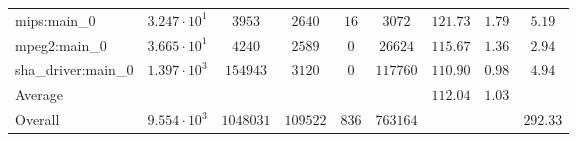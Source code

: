 \begin{tabular}{|l|c|c|c|c|c|c|c|c|}
mips:main\_0            & $ 3.247 \cdot 10^{1} $ & $ 3953    $ & $ 2640   $ & $ 16  $ & $ 3072   $ & $ 121.73      $ & $ 1.79    $ & $ 5.19    $ \\
mpeg2:main\_0           & $ 3.665 \cdot 10^{1} $ & $ 4240    $ & $ 2589   $ & $ 0   $ & $ 26624  $ & $ 115.67      $ & $ 1.36    $ & $ 2.94    $ \\
sha\_driver:main\_0     & $ 1.397 \cdot 10^{3} $ & $ 154943  $ & $ 3120   $ & $ 0   $ & $ 117760 $ & $ 110.90      $ & $ 0.98    $ & $ 4.94    $ \\
\hline
Average                 & $                    $ & $         $ & $        $ & $     $ & $        $ & $ 112.04      $ & $ 1.03    $ & $         $ \\
\hline
Overall                 & $ 9.554 \cdot 10^{3} $ & $ 1048031 $ & $ 109522 $ & $ 836 $ & $ 763164 $ & $             $ & $         $ & $ 292.33  $ \\
\hline
\end{tabular}
